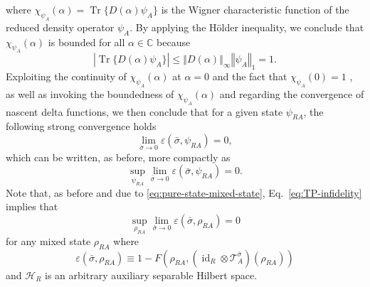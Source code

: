 \documentclass[apsrev,twocolumn]{revtex4-1}%
\begin{document}
where $\chi_{\psi_{A}}(\alpha)=\operatorname{Tr}\{D(\alpha)\psi_{A}\}$ is the
Wigner characteristic function of the reduced density operator $\psi_{A}$. By
applying the H\"{o}lder inequality, we conclude that $\chi_{\psi_{A}}(\alpha)$
is bounded for all $\alpha\in\mathbb{C}$ because%
\begin{equation}
\left\vert \operatorname{Tr}\{D(\alpha)\psi_{A}\}\right\vert \leq\left\Vert
D(\alpha)\right\Vert _{\infty}\left\Vert \psi_{A}\right\Vert _{1}=1.
\end{equation}
Exploiting the continuity of $\chi_{\psi_{A}}(\alpha)$ at $\alpha=0$ and the
fact that $\chi_{\psi_{A}}(0)=1$ \cite[Theorem~5.4.1]{Hol11}, as well as
invoking the boundedness of $\chi_{\psi_{A}}(\alpha)$ and \cite[Theorem~9.8]%
{WZ77} regarding the convergence of nascent delta functions, we then conclude
that for a given state $\psi_{RA}$, the following strong convergence holds%
\begin{equation}
\lim_{\bar{\sigma}\rightarrow0}\varepsilon(\bar{\sigma},\psi_{RA})=0,
\label{eq:fixed-state-converge}%
\end{equation}
which can be written, as before, more compactly as%
\begin{equation}
\sup_{\psi_{RA}}\lim_{\bar{\sigma}\rightarrow0}\varepsilon(\bar{\sigma}%
,\psi_{RA})=0. \label{eq:TP-infidelity}%
\end{equation}
Note that, as before and due to \eqref{eq:pure-state-mixed-state},
Eq.~\eqref{eq:TP-infidelity} implies that%
\begin{equation}
\sup_{\rho_{RA}}\lim_{\bar{\sigma}\rightarrow0}\varepsilon(\bar{\sigma}%
,\rho_{RA})=0
\end{equation}
for any mixed state $\rho_{RA}$ where%
\begin{equation}
\varepsilon(\bar{\sigma},\rho_{RA})\equiv1-F(\rho_{RA},(\operatorname{id}%
_{R}\otimes\mathcal{T}_{A}^{\bar{\sigma}})(\rho_{RA}))
\end{equation}
and $\mathcal{H}_{R}$ is an arbitrary auxiliary separable Hilbert space.
\end{document}
